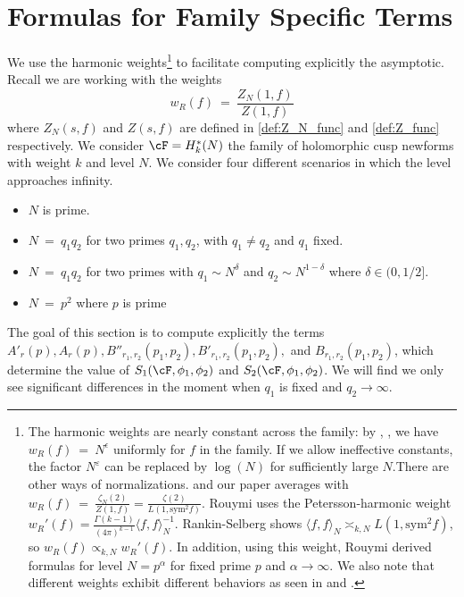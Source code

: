\documentclass[11pt, reqno]{amsart}
\theoremstyle{definition}
\theoremstyle{remark}
\numberwithin{equation}{section}
\begin{document}
\vspace{1em}

\section{Formulas for Family Specific Terms} \label{chp: sum of weights and family specific terms}

We use the harmonic weights\footnote{The harmonic weights are nearly constant across the family: by \cite{I1}, \cite{HL},\cite{Miller2009_LOTerms_1LevelDensity} we have $w_R(f)\ =\ N^{\epsilon}$ uniformly for $f$ in the family. If we allow ineffective constants, the factor $N^{\varepsilon}$ can be replaced by $\log(N)$ for sufficiently large $N$.There are other ways of normalizations. \cite{Miller2009_LOTerms_1LevelDensity} and our paper averages with 
$w_R(f)\ =\ \frac{\zeta_N(2)}{Z(1,f)} = \frac{\zeta(2)}{L(1,\mathrm{sym}^2 f)}$. Rouymi \cite{Rouymi2011TraceNonAnnulation} uses the Petersson-harmonic weight $w_R'(f)=\frac{\Gamma(k-1)}{(4\pi)^{k-1}}\langle f,f\rangle_N^{-1}$.
Rankin-Selberg shows $\langle f,f\rangle_N \asymp_{k,N} L(1,\mathrm{sym}^2 f)$, so $w_R(f)\propto_{k,N} w_R'(f)$.
In addition, using this weight, Rouymi derived formulas for  level $N = p^{\alpha}$ for fixed prime $p$ and $\alpha \to \infty$. We also note that different weights exhibit different behaviors as seen in \cite{KnightlyReno2019} and \cite{dillon2025centered}.} to facilitate computing explicitly the asymptotic. Recall we are working with the weights 
$$w_R(f)\ =\ \frac{Z_N(1,f)}{Z(1,f)}$$ where $Z_N(s,f)$ and $Z(s,f)$ are defined in \eqref{def:Z_N_func} and \eqref{def:Z_func} respectively. We consider $\cF = H_k^*(N)$ the family of holomorphic cusp newforms with weight $k$ and level $N$. We consider four different scenarios in which the level approaches infinity. 
\begin{itemize}
    \item $N$ is prime. \\
    \item $N\ =\ q_1q_2$ for two primes $q_1,q_2$, with $q_1 \neq q_2$ and $q_1$ fixed. \\
    \item $N\ =\ q_1q_2$ for two primes with $q_1 \sim N^{\delta}$ and $q_2 \sim N^{1-\delta}$ where $\delta \in (0,1/2].$ \\
    \item $N\ =\ p^2$ where $p$ is prime
\end{itemize}
The goal of this section is to compute explicitly the terms $A'_r(p), A_r(p), B''_{r_1,r_2}(p_1,p_2),B'_{r_1,r_2}(p_1,p_2),$ and $B_{r_1,r_2}(p_1,p_2)$, which determine the value of $S_1(\cF,\phi_1,\phi_2)$ and $S_2(\cF,\phi_1,\phi_2)$. We will find we only see significant differences in the moment when $q_1$ is fixed and $q_2 \to \infty.$
\end{document}
